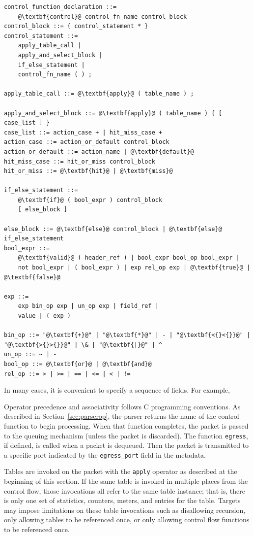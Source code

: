 \documentclass[12pt]{article}
\begin{document}
\begin{lstlisting}[frame=single,backgroundcolor=\color{bnfgreen},escapechar=\@]
control_function_declaration ::=
    @\textbf{control}@ control_fn_name control_block
control_block ::= { control_statement * }
control_statement ::=
    apply_table_call |
    apply_and_select_block |
    if_else_statement |
    control_fn_name ( ) ;

apply_table_call ::= @\textbf{apply}@ ( table_name ) ;

apply_and_select_block ::= @\textbf{apply}@ ( table_name ) { [ case_list ] }
case_list ::= action_case + | hit_miss_case +
action_case ::= action_or_default control_block
action_or_default ::= action_name | @\textbf{default}@
hit_miss_case ::= hit_or_miss control_block
hit_or_miss ::= @\textbf{hit}@ | @\textbf{miss}@

if_else_statement ::=
    @\textbf{if}@ ( bool_expr ) control_block
    [ else_block ]

else_block ::= @\textbf{else}@ control_block | @\textbf{else}@ if_else_statement
bool_expr ::=
    @\textbf{valid}@ ( header_ref ) | bool_expr bool_op bool_expr |
    not bool_expr | ( bool_expr ) | exp rel_op exp | @\textbf{true}@ | @\textbf{false}@

exp ::=
    exp bin_op exp | un_op exp | field_ref |
    value | ( exp )

bin_op ::= "@\textbf{+}@" | "@\textbf{*}@" | - | "@\textbf{<{}<{}}@" | "@\textbf{>{}>{}}@" | \& | "@\textbf{|}@" | ^
un_op ::= ~ | -
bool_op ::= @\textbf{or}@ | @\textbf{and}@
rel_op ::= > | >= | == | <= | < | !=
\end{lstlisting}

In many cases, it is convenient to specify a sequence of fields. For example,

Operator precedence and associativity follows C programming conventions.
As described in Section~\ref{sec:parserop}, the parser returns the name
of the control function to begin \matchaction processing.  When that function
completes, the packet is passed to the queuing mechanism (unless the packet
is discarded).  The function \texttt{egress}, if defined, is called when a packet
is dequeued. Then the packet is transmitted to a specific port indicated by
the \texttt{egress_port} field in the metadata.

Tables are invoked on the packet with the \texttt{apply} operator as described at
the beginning of this section. If the same table is invoked in multiple places
from the control flow, those invocations all refer to the same table instance;
that is, there is only one set of statistics, counters, meters, and \matchaction
entries for the table. Targets may impose limitations on these table invocations
such as disallowing recursion, only allowing tables to be referenced once,
or only allowing control flow functions to be referenced once.
\end{document}
